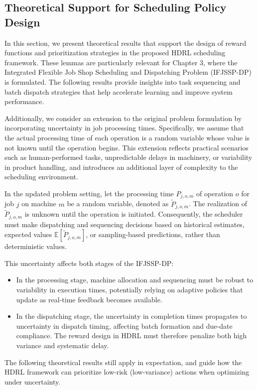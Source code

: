 \documentclass{article}
\begin{document}
\subsection{Theoretical Support for Scheduling Policy Design}

In this section, we present theoretical results that support the design of reward functions and prioritization strategies in the proposed HDRL scheduling framework. These lemmas are particularly relevant for Chapter 3, where the Integrated Flexible Job Shop Scheduling and Dispatching Problem (IFJSSP-DP) is formulated. The following results provide insights into task sequencing and batch dispatch strategies that help accelerate learning and improve system performance.

Additionally, we consider an extension to the original problem formulation by incorporating uncertainty in job processing times. Specifically, we assume that the actual processing time of each operation is a random variable whose value is not known until the operation begins. This extension reflects practical scenarios such as human-performed tasks, unpredictable delays in machinery, or variability in product handling, and introduces an additional layer of complexity to the scheduling environment.

In the updated problem setting, let the processing time $P_{j,o,m}$ of operation $o$ for job $j$ on machine $m$ be a random variable, denoted as $\tilde{P}_{j,o,m}$. The realization of $\tilde{P}_{j,o,m}$ is unknown until the operation is initiated. Consequently, the scheduler must make dispatching and sequencing decisions based on historical estimates, expected values $\mathbb{E}[\tilde{P}_{j,o,m}]$, or sampling-based predictions, rather than deterministic values.

This uncertainty affects both stages of the IFJSSP-DP:
\begin{itemize}
  \item In the processing stage, machine allocation and sequencing must be robust to variability in execution times, potentially relying on adaptive policies that update as real-time feedback becomes available.
  \item In the dispatching stage, the uncertainty in completion times propagates to uncertainty in dispatch timing, affecting batch formation and due-date compliance. The reward design in HDRL must therefore penalize both high variance and systematic delay.
\end{itemize}

The following theoretical results still apply in expectation, and guide how the HDRL framework can prioritize low-risk (low-variance) actions when optimizing under uncertainty.
\end{document}
